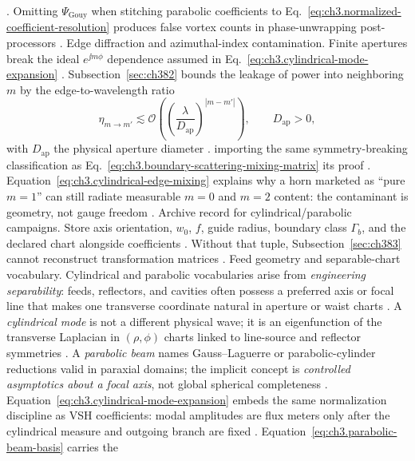 \cite{harrington2001}. Omitting \(\Psi_{\mathrm{Gouy}}\) when stitching parabolic coefficients to
Eq.~\eqref{eq:ch3.normalized-coefficient-resolution} produces false vortex counts in phase-unwrapping post-processors \cite{allen1992}.
Edge diffraction and azimuthal-index contamination. Finite apertures break the ideal \(e^{\jj m\phi}\) dependence assumed in Eq.~\eqref{eq:ch3.cylindrical-mode-expansion} \cite{stratton1941}.
Subsection~\ref{sec:ch382} bounds the leakage of power into neighboring \(m\) by the edge-to-wavelength ratio
\begin{equation}
\label{eq:ch3.cylindrical-edge-mixing}
\eta_{m\rightarrow m'}
\lesssim
\mathcal{O}\!\left(\left(\frac{\lambda}{D_{\mathrm{ap}}}\right)^{|m-m'|}\right),
\qquad
D_{\mathrm{ap}}>0,
\end{equation}
with \(D_{\mathrm{ap}}\) the physical aperture diameter \cite{stratton1941}.
importing the same symmetry-breaking classification as Eq.~\eqref{eq:ch3.boundary-scattering-mixing-matrix} its proof
\cite{harrington2001}. Equation~\eqref{eq:ch3.cylindrical-edge-mixing} explains why a horn marketed as ``pure \(m=1\)'' can
still radiate measurable \(m=0\) and \(m=2\) content: the contaminant is geometry, not gauge freedom \cite{jackson1999}.
Archive record for cylindrical/parabolic campaigns. Store axis orientation, \(w_{0}\), \(f\), guide radius, boundary class \(\Gamma_{b}\), and the declared chart alongside coefficients
\cite{harrington2001}. Without that tuple, Subsection~\ref{sec:ch383} cannot reconstruct transformation matrices
\cite{hansen1988}.
Feed geometry and separable-chart vocabulary. Cylindrical and parabolic vocabularies arise from \emph{engineering separability}: feeds, reflectors, and cavities
often possess a preferred axis or focal line that makes one transverse coordinate natural in aperture or waist charts
\cite{stratton1941}. A \emph{cylindrical mode} is not a different physical wave; it is an eigenfunction
of the transverse Laplacian in \((\rho,\phi)\) charts linked to line-source and reflector symmetries
\cite{hansen1988}. A \emph{parabolic beam} names Gauss--Laguerre or parabolic-cylinder reductions valid in
paraxial domains; the implicit concept is \emph{controlled asymptotics about a focal axis}, not global spherical
completeness \cite{allen1992}. Equation~\eqref{eq:ch3.cylindrical-mode-expansion} embeds the same
normalization discipline as VSH coefficients: modal amplitudes are flux meters only after the cylindrical measure and
outgoing branch are fixed \cite{stratton1941}. Equation~\eqref{eq:ch3.parabolic-beam-basis} carries the
